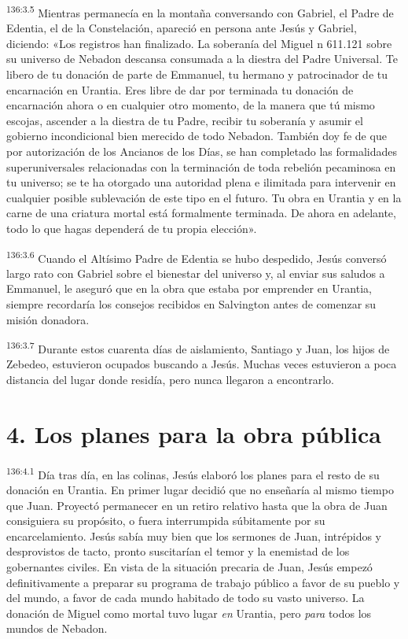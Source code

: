 \par
\textsuperscript{136:3.5} Mientras permanecía en la montaña conversando con Gabriel, el Padre de Edentia, el de la Constelación, apareció en persona ante Jesús y Gabriel, diciendo: «Los registros han finalizado. La soberanía del Miguel n{\textordmasculine} 611.121 sobre su universo de Nebadon descansa consumada a la diestra del Padre Universal. Te libero de tu donación de parte de Emmanuel, tu hermano y patrocinador de tu encarnación en Urantia. Eres libre de dar por terminada tu donación de encarnación ahora o en cualquier otro momento, de la manera que tú mismo escojas, ascender a la diestra de tu Padre, recibir tu soberanía y asumir el gobierno incondicional bien merecido de todo Nebadon. También doy fe de que por autorización de los Ancianos de los Días, se han completado las formalidades superuniversales relacionadas con la terminación de toda rebelión pecaminosa en tu universo; se te ha otorgado una autoridad plena e ilimitada para intervenir en cualquier posible sublevación de este tipo en el futuro. Tu obra en Urantia y en la carne de una criatura mortal está formalmente terminada. De ahora en adelante, todo lo que hagas dependerá de tu propia elección».

\par
\textsuperscript{136:3.6} Cuando el Altísimo Padre de Edentia se hubo despedido, Jesús conversó largo rato con Gabriel sobre el bienestar del universo y, al enviar sus saludos a Emmanuel, le aseguró que en la obra que estaba por emprender en Urantia, siempre recordaría los consejos recibidos en Salvington antes de comenzar su misión donadora.

\par
\textsuperscript{136:3.7} Durante estos cuarenta días de aislamiento, Santiago y Juan, los hijos de Zebedeo, estuvieron ocupados buscando a Jesús. Muchas veces estuvieron a poca distancia del lugar donde residía, pero nunca llegaron a encontrarlo.

\section*{4. Los planes para la obra pública}
\par
\textsuperscript{136:4.1} Día tras día, en las colinas, Jesús elaboró los planes para el resto de su donación en Urantia. En primer lugar decidió que no enseñaría al mismo tiempo que Juan. Proyectó permanecer en un retiro relativo hasta que la obra de Juan consiguiera su propósito, o fuera interrumpida súbitamente por su encarcelamiento. Jesús sabía muy bien que los sermones de Juan, intrépidos y desprovistos de tacto, pronto suscitarían el temor y la enemistad de los gobernantes civiles. En vista de la situación precaria de Juan, Jesús empezó definitivamente a preparar su programa de trabajo público a favor de su pueblo y del mundo, a favor de cada mundo habitado de todo su vasto universo. La donación de Miguel como mortal tuvo lugar \textit{en} Urantia, pero \textit{para} todos los mundos de Nebadon.

